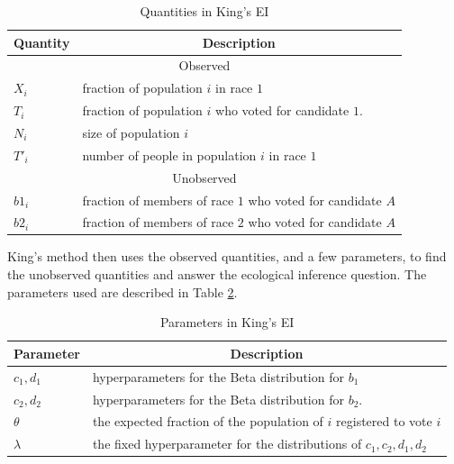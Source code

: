 \begin{table}[ht]
 \centering
 \caption{Quantities in King's EI}
 \label{table:ei_quantities}
 \begin{tabular}{|l|l|}
  \hline
  \multicolumn{1}{|c|}{Quantity} & \multicolumn{1}{|c|}{Description}                           \\
  \hline
  \multicolumn{2}{|c|}{Observed}                                                               \\
  \hline
  $X_i$                          & fraction of population $i$ in race $1$                      \\
  $T_i$                          & fraction of population $i$ who voted for candidate $1$.     \\
  $N_i$                          & size of population $i$                                      \\
  $T'_i$                         & number of people in population $i$ in race $1$              \\
  \hline
  \multicolumn{2}{|c|}{Unobserved}                                                             \\
  \hline
  $b1_i$                         & fraction of members of race $1$ who voted for candidate $A$ \\
  $b2_i$                         & fraction of members of race $2$ who voted for candidate $A$ \\
  \hline
 \end{tabular}
\end{table}

King's method then uses the observed quantities, and a few parameters, to find the unobserved quantities and answer the ecological inference question. The parameters used are described in Table \ref{table:ei_params}.

\begin{table}[ht]
 \centering
 \caption{Parameters in King's EI}
 \label{table:ei_params}
 \begin{tabular}{|l|l|}
  \hline
  \multicolumn{1}{|c|}{Parameter} & \multicolumn{1}{|c|}{Description}                                     \\
  \hline
  $c_1, d_1$                     & hyperparameters for the Beta distribution for $b_1$                   \\
  $c_2, d_2$                     & hyperparameters for the Beta distribution for $b_2$.                  \\
  $\theta$                       & the expected fraction of the population of $i$ registered to vote $i$ \\
  $\lambda$                      & the fixed hyperparameter for the distributions of $c_1, c_2, d_1, d_2$ \\
  \hline
 \end{tabular}
\end{table}

